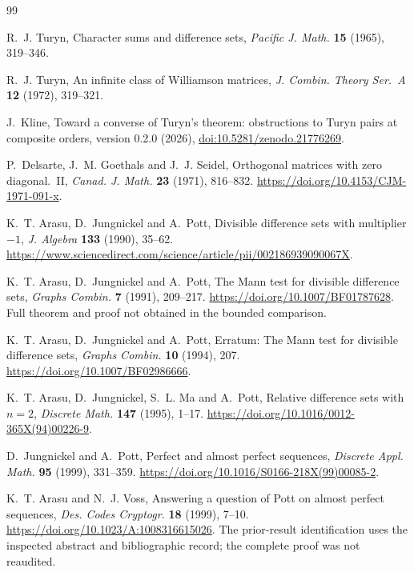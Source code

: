 \documentclass[11pt]{article}
\theoremstyle{definition}
\theoremstyle{remark}
\begin{document}
\begin{thebibliography}{99}

R.~J. Turyn, Character sums and difference sets,
\emph{Pacific J. Math.} \textbf{15} (1965), 319--346.

R.~J. Turyn, An infinite class of Williamson matrices,
\emph{J. Combin. Theory Ser.~A} \textbf{12} (1972), 319--321.

J.~Kline, Toward a converse of Turyn's theorem: obstructions to Turyn pairs
at composite orders, version 0.2.0 (2026),
\href{https://doi.org/10.5281/zenodo.21776269}{doi:10.5281/zenodo.21776269}.

P.~Delsarte, J.~M. Goethals and J.~J. Seidel,
Orthogonal matrices with zero diagonal.~II,
\emph{Canad. J. Math.} \textbf{23} (1971), 816--832.
\url{https://doi.org/10.4153/CJM-1971-091-x}.

K.~T. Arasu, D.~Jungnickel and A.~Pott,
Divisible difference sets with multiplier $-1$,
\emph{J. Algebra} \textbf{133} (1990), 35--62.
\url{https://www.sciencedirect.com/science/article/pii/002186939090067X}.

K.~T. Arasu, D.~Jungnickel and A.~Pott,
The Mann test for divisible difference sets,
\emph{Graphs Combin.} \textbf{7} (1991), 209--217.
\url{https://doi.org/10.1007/BF01787628}.
Full theorem and proof not obtained in the bounded comparison.

K.~T. Arasu, D.~Jungnickel and A.~Pott,
Erratum: The Mann test for divisible difference sets,
\emph{Graphs Combin.} \textbf{10} (1994), 207.
\url{https://doi.org/10.1007/BF02986666}.

K.~T. Arasu, D.~Jungnickel, S.~L. Ma and A.~Pott,
Relative difference sets with $n=2$,
\emph{Discrete Math.} \textbf{147} (1995), 1--17.
\url{https://doi.org/10.1016/0012-365X(94)00226-9}.

D.~Jungnickel and A.~Pott, Perfect and almost perfect sequences,
\emph{Discrete Appl. Math.} \textbf{95} (1999), 331--359.
\url{https://doi.org/10.1016/S0166-218X(99)00085-2}.

K.~T. Arasu and N.~J. Voss,
Answering a question of Pott on almost perfect sequences,
\emph{Des. Codes Cryptogr.} \textbf{18} (1999), 7--10.
\url{https://doi.org/10.1023/A:1008316615026}.
The prior-result identification uses the inspected abstract and bibliographic
record; the complete proof was not reaudited.


\end{thebibliography}
\end{document}

